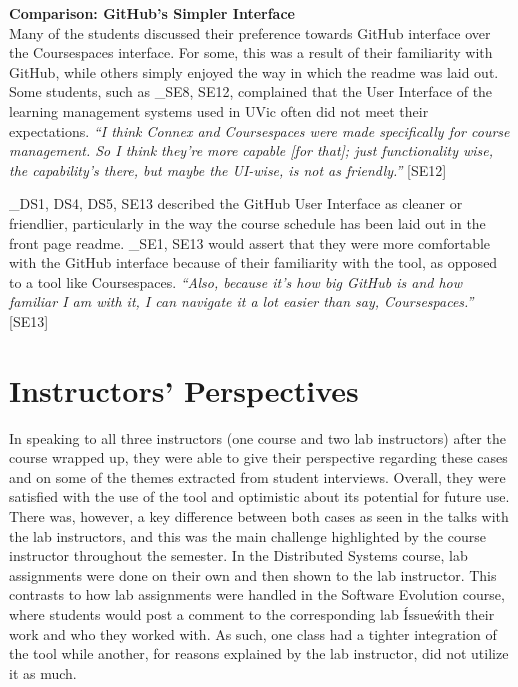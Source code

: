 \textbf{Comparison: GitHub's Simpler Interface} \\
Many of the students discussed their preference towards GitHub interface over the Coursespaces interface. For some, this was a result of their familiarity with GitHub, while others simply enjoyed the way in which the readme was laid out. Some students, such as _{SE8, SE12}, complained that the User Interface of the learning management systems used in UVic often did not meet their expectations. \textit{``I think Connex and Coursespaces were made specifically for course management. So I think they're more capable [for that]; just functionality wise, the capability's there, but maybe the UI-wise, is not as friendly.''} [SE12]

_{DS1, DS4, DS5, SE13} described the GitHub User Interface as cleaner or friendlier, particularly in the way the course schedule has been laid out in the front page readme. _{SE1, SE13} would assert that they were more comfortable with the GitHub interface because of their familiarity with the tool, as opposed to a tool like Coursespaces. \textit{``Also, because it's how big GitHub is and how familiar I am with it, I can navigate it a lot easier than say, Coursespaces.''} [SE13]


\section{Instructors' Perspectives}
In speaking to all three instructors (one course and two lab instructors) after the course wrapped up, they were able to give their perspective regarding these cases and on some of the themes extracted from student interviews. Overall, they were satisfied with the use of the tool and optimistic about its potential for future use. There was, however, a key difference between both cases as seen in the talks with the lab instructors, and this was the main challenge highlighted by the course instructor throughout the semester. In the Distributed Systems course, lab assignments were done on their own and then shown to the lab instructor. This contrasts to how lab assignments were handled in the Software Evolution course, where students would post a comment to the corresponding lab \'Issue\' with their work and who they worked with. As such, one class had a tighter integration of the tool while another, for reasons explained by the lab instructor, did not utilize it as much.


